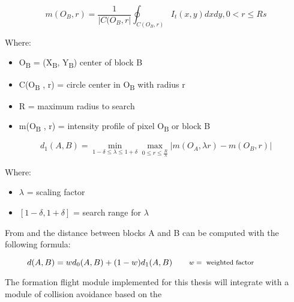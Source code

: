 \begin{equation}
m(O_{B}, r) = \frac{1}{ | C(O_{B}, r |}\oint_{C(O_{B}, r)}I_{t}(x, y)dxdy,  0 < r \leq R
  \label{eqn:intensity-profile-pixel}s
\end{equation}

Where: 
\begin {itemize}
  \item {O}\textsubscript{B} = (X\textsubscript{B}, Y\textsubscript{B}) center of block B
  \item C(O\textsubscript{B} , r) = circle center in O\textsubscript{B}  with radius r
  \item R = maximum radius to search
  \item m(O\textsubscript{B} , r) = intensity profile of pixel O\textsubscript{B}  or block B
\end {itemize}

 
\begin{equation}
d_{1}(A, B) = \min_{1 - \delta \leq  \lambda \leq 1 + \delta} \max_{0 \leq r \leq \frac{R}{\lambda}} | m(O_{A},  \lambda r) - m(O_{B}, r) |
\label{eqn:distance-block}
\end{equation}

Where: 
\begin {itemize}
  \item $\lambda$ = scaling factor
  \item $[1 - \delta, 1 + \delta]$  = search range for $\lambda$
\end {itemize}

From  and 
 the distance between blocks A and B
can be computed with the following formula:

\begin{equation}
d(A, B) = w d_{0}(A, B) + (1 - w) d_{1}(A, B)
\qquad\parbox{4.0cm}{\footnotesize$\begin{aligned} 
  w &= \text{ weighted factor }
  \end{aligned}$}
\label{eqn: distance-block}
\end{equation}

The formation flight module implemented for this thesis will integrate with 
a module of collision avoidance based on the 

